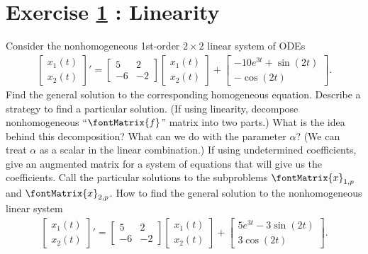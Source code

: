 %
%
%
%
%

\section{Exercise \ref{sec : Math211 Summer2019 ExamOral : Linearity} : Linearity}
\label{sec : Math211 Summer2019 ExamOral : Linearity}

Consider the nonhomogeneous 1st-order $2 \times 2$ linear system of ODEs
\begin{align}
\begin{bmatrix}%
x_{1}(t)	\\
x_{2}(t)
\end{bmatrix}%
'
=
\begin{bmatrix}%
5	&	2	\\
-6	&	-2
\end{bmatrix}%
\begin{bmatrix}%
x_{1}(t)	\\
x_{2}(t)
\end{bmatrix}%
+
\begin{bmatrix}%
-10 e^{3 t} + \sin(2 t)	\\
-\cos(2 t)
\end{bmatrix}%
.
\label{eq : Oral Linearity ODE}
\end{align}
Find the general solution to the corresponding homogeneous equation. Describe a strategy to find a particular solution. (If using linearity, decompose nonhomogeneous ``$\fontMatrix{f}$'' matrix into two parts.) What is the idea behind this decomposition? What can we do with the parameter $\alpha$? (We can treat $\alpha$ as a scalar in the linear combination.) If using undetermined coefficients, give an augmented matrix for a system of equations that will give us the coefficients. Call the particular solutions to the subproblems $\fontMatrix{x}_{1,p}$ and $\fontMatrix{x}_{2,p}$. How to find the general solution to the nonhomogeneous linear system
\begin{align}
\begin{bmatrix}%
x_{1}(t)	\\
x_{2}(t)
\end{bmatrix}%
'
=
\begin{bmatrix}%
5	&	2	\\
-6	&	-2
\end{bmatrix}%
\begin{bmatrix}%
x_{1}(t)	\\
x_{2}(t)
\end{bmatrix}%
+
\begin{bmatrix}%
5 e^{3 t} - 3 \sin(2 t)	\\
3 \cos(2 t)
\end{bmatrix}%
.
\end{align}





